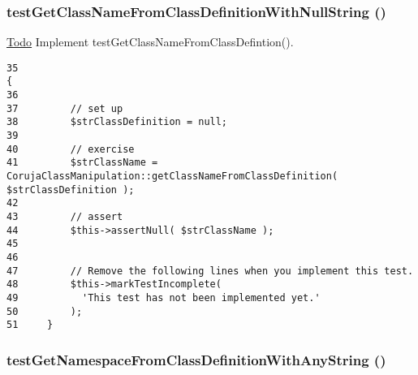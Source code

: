 \hypertarget{class_coruja_class_manipulation_test_cf31c2bf27f0eb9c156d709faae15866}{
\subsubsection[{testGetClassNameFromClassDefinitionWithNullString}]{\setlength{\rightskip}{0pt plus 5cm}testGetClassNameFromClassDefinitionWithNullString ()}}
\label{class_coruja_class_manipulation_test_cf31c2bf27f0eb9c156d709faae15866}


\begin{Desc}
\item[\hyperlink{todo__todo000006}{Todo}]Implement testGetClassNameFromClassDefintion(). \end{Desc}


\begin{Code}\begin{verbatim}35                                                                         {
36 
37         // set up
38         $strClassDefinition = null;
39 
40         // exercise
41         $strClassName = CorujaClassManipulation::getClassNameFromClassDefinition( $strClassDefinition );
42 
43         // assert
44         $this->assertNull( $strClassName );
45 
46         
47         // Remove the following lines when you implement this test.
48         $this->markTestIncomplete(
49           'This test has not been implemented yet.'
50         );
51     }
\end{verbatim}
\end{Code}


\hypertarget{class_coruja_class_manipulation_test_b6590619b10123f5b485b45210d3092a}{
\subsubsection[{testGetNamespaceFromClassDefinitionWithAnyString}]{\setlength{\rightskip}{0pt plus 5cm}testGetNamespaceFromClassDefinitionWithAnyString ()}}
\label{class_coruja_class_manipulation_test_b6590619b10123f5b485b45210d3092a}


